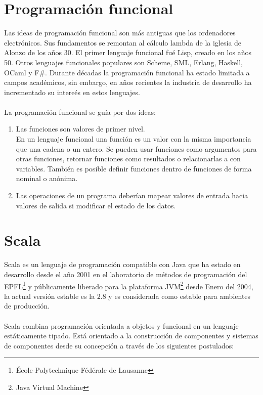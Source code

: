 \section{Programaci\'on funcional}

  Las ideas de programaci\'on funcional son m\'as antiguas que los
  ordenadores electr\'onicos. Sus fundamentos se remontan al c\'alculo
  lambda de la iglesia de Alonzo de los a\~nos 30. El primer lenguaje
  funcional fu\'e Lisp, creado en los a\~nos 50. Otros lenguajes
  funcionales populares son Scheme, SML, Erlang, Haskell, OCaml y
  F\#. Durante d\'ecadas la programaci\'on funcional ha estado
  limitada a campos acad\'emicos, sin embargo, en a\~nos recientes la
  industria de desarrollo ha incrementado su intere\'es en estos
  lenguajes\citep{programmingScala}.
\\
\\
  La programaci\'on funcional se gu\'ia por dos ideas:

  \begin{enumerate}
   \item Las funciones son valores de primer nivel.  \\ En un lenguaje
     funcional una funci\'on es un valor con la misma importancia que
     una cadena o un entero. Se pueden usar funciones como argumentos
     para otras funciones, retornar funciones como resultados o
     relacionarlas a con variables. Tambi\'en es posible definir
     funciones dentro de funciones de forma nominal o an\'onima.

   \item Las operaciones de un programa deber\'ian mapear valores de
     entrada hacia valores de salida si modificar el estado de los
     datos.
  \end{enumerate}

\section{Scala}

  Scala es un lenguaje de programaci\'on compatible con Java que ha
  estado en desarrollo desde el a\~no 2001 en el laboratorio de
  m\'etodos de programaci\'on del EPFL\footnote{\'Ecole Polytechnique
    F\'ed\'erale de Lausanne} y p\'ublicamente liberado para la
  plataforma JVM\footnote{Java Virtual Machine} desde Enero del 2004,
  la actual versi\'on estable es la 2.8 y es considerada como estable
  para ambientes de producci\'on.
\\
\\
  Scala combina programaci\'on orientada a objetos y funcional en un
  lenguaje est\'aticamente tipado. Est\'a orientado a la
  construcci\'on de componentes y sistemas de componentes desde su
  concepci\'on a trav\'es de los siguientes
  postulados\citep{scalaIntro}:

